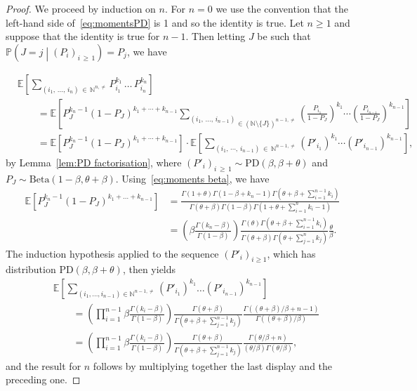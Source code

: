 \documentclass[10pt]{amsart}
\theoremstyle{definition}\newtheorem{defi}[theo]{Definition}\newtheorem{rema}[theo]{Remark}\newtheorem{exam}[theo]{Example}\newtheorem{exem}[theo]{Example}\newtheorem{nota}[theo]{Notation}
\newcommand{\Ec}[1]{\mathbb{E} \left[#1\right]}
\newcommand{\Ppsq}[2]{\mathbb{P} \left(#1\mathrel{}\middle|\mathrel{}#2\right)}
\newcommand{\Betal}{\mathrm{Beta}}
\newcommand{\PD}{\mathrm{PD}}
\newcommand{\N}{\mathbb{N}}
\begin{document}
\begin{proof}
We proceed by induction on $n$. For $n=0$ we use the convention that the left-hand side of~\eqref{eq:momentsPD} is 1 and so the identity is true. Let $n\geq 1$ and suppose that the identity is true for $n-1$. Then letting $J$ be such that $\Ppsq{J=j}{(P_i)_{i\,\geq\,1}}=P_j$, we have

\begin{align*}
& \Ec{ \sum_{\left(i_1,\,\ldots,\,i_n\right)\,\in\,\N^{n,\neq}} P_{i_1}^{k_1}\,\dots\,P_{i_n}^{k_n} } \\
& \qquad =\Ec{ P_J^{k_n-1} (1-P_J)^{k_1+\cdots+k_{n-1} } \underset{\in \left(\N\setminus\{J\}\right)^{n-1,\neq}}{\sum_{\left(i_1,\,\dots,\,i_{n-1}\right)}}\left(\frac{P_{i_1}}{1-P_J} \right)^{k_1} \cdots \left(\frac{P_{i_{n-1}}}{1-P_J}\right) ^{k_{n-1}}}\\
& \qquad = \Ec{P_J^{k_n-1}\left(1-P_J\right)^{k_1+\cdots+k_{n-1}}} \cdot \Ec{\sum_{\left(i_1,\,\cdots,\,i_{n-1}\right)\,\in\,\N^{n-1,\neq}}\left(P'_{i_1}\right)^{k_1} \cdots \left(P'_{i_{n-1}}\right)^{k_{n-1}}},
\end{align*}
by Lemma~\ref{lem:PD factorisation}, where $(P'_i)_{i\,\geq\,1}\sim \PD(\beta,\beta+\theta)$ and $P_J\sim\Betal(1-\beta,\theta+\beta)$. Using~\eqref{eq:moments beta}, we have
\begin{align*}
\Ec{ P_J^{k_n-1}(1-P_J)^{k_1+\dots+k_{n-1}}}&=\frac{\Gamma(1+\theta)\Gamma(1-\beta+k_n-1)\Gamma\left(\theta+\beta+\sum\limits_{i=1}^{n-1}k_i\right)}{\Gamma(\theta+\beta)\Gamma(1-\beta)\Gamma\left(1+\theta+\sum\limits_{i=1}^{n}k_i-1\right)}\\
&=\left(\beta\frac{\Gamma(k_n-\beta)}{\Gamma(1-\beta)}\right)\frac{\Gamma(\theta)\Gamma\left(\theta+\beta+\sum\limits_{i=1}^{n-1}k_i\right)}{\Gamma(\theta+\beta)\Gamma\left(\theta+\sum\limits_{j=1}^{n}k_j\right)}\frac{\theta}{\beta}.
\end{align*}
The induction hypothesis applied to the sequence $(P'_i)_{i\geq 1}$, which has distribution $\PD(\beta,\beta+\theta)$, then yields
\begin{align*}
& \Ec{\sum_{(i_1,\dots,i_{n-1})\in \N^{n-1,\neq}}(P'_{i_1})^{k_1} \dots (P'_{i_{n-1}})^{k_{n-1}}} \\
&\qquad =\left(\prod_{i=1}^{n-1} \beta \frac{\Gamma(k_i-\beta)}{\Gamma(1-\beta)}\right)\frac{\Gamma(\theta+\beta)}{\Gamma(\theta+\beta+\sum_{j=1}^{n-1} k_j)} \frac{\Gamma((\theta+\beta)/\beta+n-1)}{\Gamma((\theta+\beta)/\beta)}\\
&\qquad =\left(\prod_{i=1}^{n-1} \beta \frac{\Gamma(k_i-\beta)}{\Gamma(1-\beta)}\right)\frac{\Gamma(\theta+\beta)}{\Gamma(\theta+\beta+\sum_{j=1}^{n-1} k_j)} \frac{\Gamma(\theta/\beta+n)}{(\theta/\beta)\Gamma(\theta/\beta)},
\end{align*}
and the result for $n$ follows by multiplying together the last display and the preceding one.
\end{proof}
\end{document}
